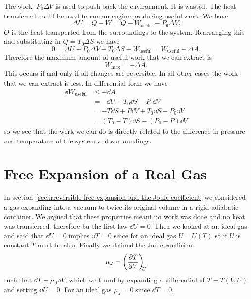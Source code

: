 \documentclass[a4paper]{article}
\begin{document}
    The work, \(P_0\Delta V\) is used to push back the environment.
    It is wasted.
    The heat transferred could be used to run an engine producing useful work.
    We have
    \[\Delta U = Q - W = Q - W_\text{useful} - P_0\Delta V.\]
    \(Q\)  is the heat transported from the surroundings to the system.
    Rearranging this and substituting in \(Q = T_0\Delta S\) we have
    \[0 = \Delta U + P_0\Delta V - T_0\Delta S + W_\text{useful} = W_\text{useful} - \Delta A.\]
    Therefore the maximum amount of useful work that we can extract is 
    \[W_{\max} = -\Delta A.\]
    This occurs if and only if all changes are reversible.
    In all other cases the work that we can extract is less.
    In differential form we have
    \begin{align*}
        \dd{W_\text{useful}} &\le -\dd{A}\\
        &= -\dd{U} + T_0\dd{S} - P_0\dd{V}\\
        &= -T\dd{S} + P\dd{V} + T_0\dd{S} - P_0\dd{V}\\
        &= (T_0 - T)\dd{S} - (P_0 - P)\dd{V}
    \end{align*}
    so we see that the work we can do is directly related to the difference in pressure and temperature of the system and surroundings.
    
    \section{Free Expansion of a Real Gas}
    In section~\ref{sec:irreversible free expansion and the Joule coefficient} we considered a gas expanding into a vacuum to twice its original volume in a rigid adiabatic container.
    We argued that these properties meant no work was done and no heat was transferred, therefore bu the first law \(\dd{U} = 0\).
    Then we looked at an ideal gas and said that \(\dd{U} = 0\) implies \(\dd{T} = 0\) since for an ideal gas \(U = U(T)\) so if \(U\) is constant \(T\) must be also.
    Finally we defined the Joule coefficient
    \[\mu_J = \left(\pdv[]{T}{V}\right)_{\!\!{U}}\]
    such that \(\dd{T} = \mu_J\dd{V}\), which we found by expanding a differential of \(T = T(V, U)\) and setting \(\dd{U} = 0\).
    For an ideal gas \(\mu_J = 0\) since \(\dd{T} = 0\).
    
\end{document}
